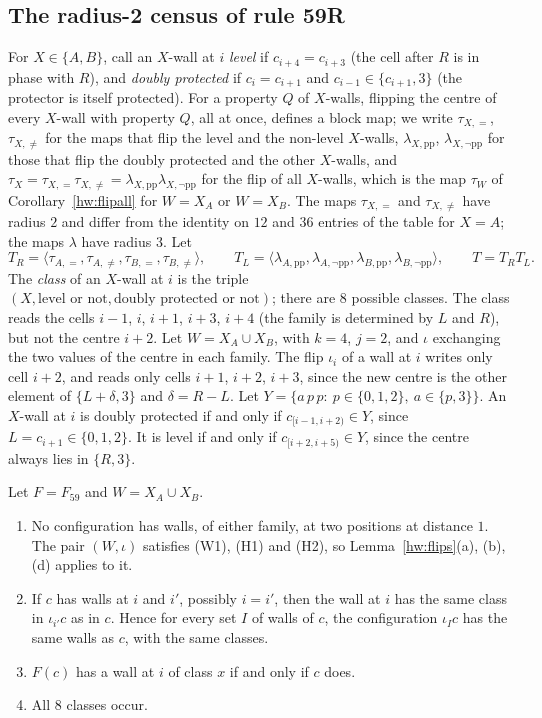 \subsection{The radius-2 census of rule 59R}\label{hw:sec:census}

For $X\in\{A,B\}$, call an $X$-wall at $i$ \emph{level} if $c_{i+4}=c_{i+3}$ (the cell after $R$ is in phase with $R$), and \emph{doubly protected} if $c_i=c_{i+1}$ and $c_{i-1}\in\{c_{i+1},3\}$ (the protector is itself protected). For a property $Q$ of $X$-walls, flipping the centre of every $X$-wall with property $Q$, all at once, defines a block map; we write $\tau_{X,=}$, $\tau_{X,\ne}$ for the maps that flip the level and the non-level $X$-walls, $\lambda_{X,\mathrm{pp}}$, $\lambda_{X,\lnot\mathrm{pp}}$ for those that flip the doubly protected and the other $X$-walls, and $\tau_X=\tau_{X,=}\tau_{X,\ne}=\lambda_{X,\mathrm{pp}}\lambda_{X,\lnot\mathrm{pp}}$ for the flip of all $X$-walls, which is the map $\tau_W$ of Corollary~\ref{hw:flipall} for $W=X_A$ or $W=X_B$. The maps $\tau_{X,=}$ and $\tau_{X,\ne}$ have radius $2$ and differ from the identity on $12$ and $36$ entries of the table for $X=A$; the maps $\lambda$ have radius $3$. Let
\[
T_R=\langle\tau_{A,=},\tau_{A,\ne},\tau_{B,=},\tau_{B,\ne}\rangle,\qquad T_L=\langle\lambda_{A,\mathrm{pp}},\lambda_{A,\lnot\mathrm{pp}},\lambda_{B,\mathrm{pp}},\lambda_{B,\lnot\mathrm{pp}}\rangle,\qquad T=T_RT_L .
\]
The \emph{class} of an $X$-wall at $i$ is the triple $(X,\text{level or not},\text{doubly protected or not})$; there are $8$ possible classes. The class reads the cells $i-1$, $i$, $i+1$, $i+3$, $i+4$ (the family is determined by $L$ and $R$), but not the centre $i+2$. Let $W=X_A\cup X_B$, with $k=4$, $j=2$, and $\iota$ exchanging the two values of the centre in each family. The flip $\iota_i$ of a wall at $i$ writes only cell $i+2$, and reads only cells $i+1$, $i+2$, $i+3$, since the new centre is the other element of $\{L+\delta,3\}$ and $\delta=R-L$. Let $Y=\{a\,p\,p:\ p\in\{0,1,2\},\ a\in\{p,3\}\}$. An $X$-wall at $i$ is doubly protected if and only if $c_{[i-1,i+2)}\in Y$, since $L=c_{i+1}\in\{0,1,2\}$. It is level if and only if $c_{[i+2,i+5)}\in Y$, since the centre always lies in $\{R,3\}$.

\begin{lemma}\label{hw:59classes}
Let $F=F_{59}$ and $W=X_A\cup X_B$.
\begin{enumerate}
\item[(i)] No configuration has walls, of either family, at two positions at distance $1$. The pair $(W,\iota)$ satisfies \textup{(W1)}, \textup{(H1)} and \textup{(H2)}, so Lemma~\ref{hw:flips}(a), (b), (d) applies to it.
\item[(ii)] If $c$ has walls at $i$ and $i'$, possibly $i=i'$, then the wall at $i$ has the same class in $\iota_{i'}c$ as in $c$. Hence for every set $I$ of walls of $c$, the configuration $\iota_Ic$ has the same walls as $c$, with the same classes.
\item[(iii)] $F(c)$ has a wall at $i$ of class $x$ if and only if $c$ does.
\item[(iv)] All $8$ classes occur.
\end{enumerate}
\end{lemma}

